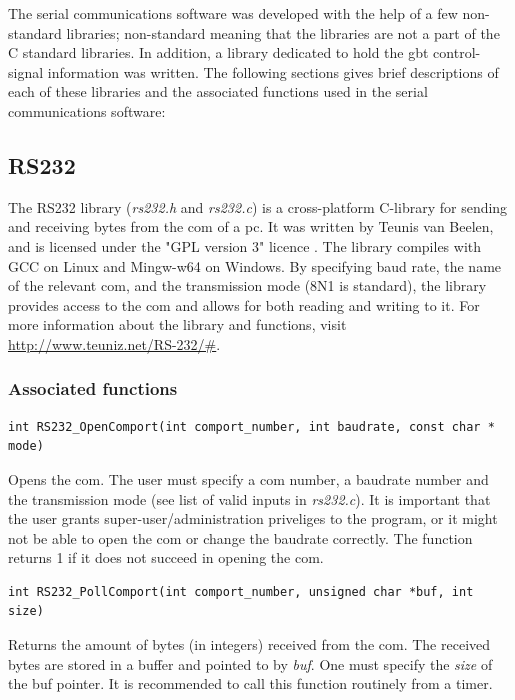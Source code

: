 \documentclass[main.tex]{subfiles}
\begin{document}
The serial communications software was developed with the help of a few non-standard libraries; non-standard meaning that the libraries are not a part of the C standard libraries. In addition, a library dedicated to hold the \gls{gbt} control-signal information was written.
The following sections gives brief descriptions of each of these libraries and the associated functions used in the serial communications software:

\subsection{RS232}

The RS232 library (\textit{rs232.h} and \textit{rs232.c}) is a cross-platform C-library for sending and receiving bytes from the \gls{com} of a \acrshort{pc}. It was written by Teunis van Beelen, and is licensed under the "GPL version 3" licence \cite{gpl3}. The library compiles with GCC on Linux and Mingw-w64 on Windows. By specifying baud rate, the name of the relevant \gls{com}, and the transmission mode (8N1 is standard), the library provides access to the \gls{com} and allows for both reading and writing to it. For more information about the library and functions, visit \url{http://www.teuniz.net/RS-232/#}.

\subsubsection{Associated functions}


\begin{lstlisting}[frame=single] 
int RS232_OpenComport(int comport_number, int baudrate, const char * mode)
\end{lstlisting}
Opens the \gls{com}. The user must specify a \gls{com} number, a baudrate number and the transmission mode (see list of valid inputs in \textit{rs232.c}). It is important that the user grants super-user/administration priveliges to the program, or it might not be able to open the \gls{com} or change the baudrate correctly. The function returns 1 if it does not succeed in opening the \gls{com}.\\

\begin{lstlisting}[frame=single] 
int RS232_PollComport(int comport_number, unsigned char *buf, int size)
\end{lstlisting}
Returns the amount of bytes (in integers) received from the \gls{com}. The received bytes are stored in a buffer and pointed to by \textit{buf}. One must specify the \textit{size} of the buf pointer. It is recommended to call this function routinely from a timer.\\
\end{document}
